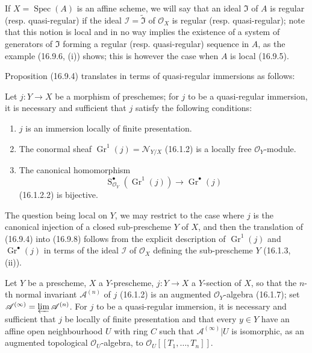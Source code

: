\begin{env}[16.9.7]\label{IV.16.9.7}
If $X=\operatorname{Spec}(A)$ is an affine scheme, we will say that an ideal
$\mathfrak{I}$ of $A$ is regular (resp. quasi-regular) if the ideal
$\mathscr{I}=\widetilde{\mathfrak{I}}$ of $\mathcal{O}_X$ is regular
(resp. quasi-regular); note that this notion is local and in no way implies
the existence of a system of generators of $\mathfrak{I}$ forming a regular
(resp. quasi-regular) sequence in $A$, as the example (16.9.6, (i)) shows;
this is however the case when $A$ is local (16.9.5).

Proposition (16.9.4) translates in terms of quasi-regular immersions
as follows:
\end{env}

\begin{proposition}[16.9.8]
\label{IV.16.9.8}
Let $j:Y\to X$ be a morphism of preschemes; for $j$ to be a quasi-regular
immersion, it is necessary and sufficient that $j$ satisfy the following
conditions:
\begin{enumerate}
  \item[(i)] $j$ is an immersion locally of finite presentation.
  \item[(ii)] The conormal sheaf
  $\operatorname{Gr}^1(j)=\mathcal{N}_{Y/X}$ (16.1.2) is a locally free
  $\mathcal{O}_Y$-module.
  \item[(iii)] The canonical homomorphism
  \[
    \operatorname{S}_{\mathcal{O}_Y}^{\bullet}
      (\operatorname{Gr}^1(j))\longrightarrow\operatorname{Gr}^{\bullet}(j)
  \]
  (16.1.2.2) is bijective.
\end{enumerate}
\end{proposition}

The question being local on $Y$, we may restrict to the case where $j$ is
the canonical injection of a closed sub-prescheme $Y$ of $X$, and then the
translation of (16.9.4) into (16.9.8) follows from the explicit description
of $\operatorname{Gr}^1(j)$ and $\operatorname{Gr}^{\bullet}(j)$ in terms of
the ideal $\mathscr{I}$ of $\mathcal{O}_X$ defining the sub-prescheme $Y$
(16.1.3, (ii)).

\begin{corollary}[16.9.9]
\label{IV.16.9.9}
Let $Y$ be a prescheme, $X$ a $Y$-prescheme, $j:Y\to X$ a $Y$-section
of $X$, so that the $n$-th normal invariant $\mathscr{A}^{(n)}$ of $j$
(16.1.2) is an augmented $\mathcal{O}_Y$-algebra (16.1.7); set
$\mathscr{A}^{(\infty)}=\varprojlim\mathscr{A}^{(n)}$. For $j$ to be a
quasi-regular immersion, it is necessary and sufficient that $j$ be locally
of finite presentation and that every $y\in Y$ have an affine open
neighbourhood $U$ with ring $C$ such that $\mathscr{A}^{(\infty)}|U$ is
isomorphic, as an augmented topological $\mathcal{O}_U$-algebra, to
$\mathcal{O}_U[[T_1,\ldots,T_n]]$.
\end{corollary}

